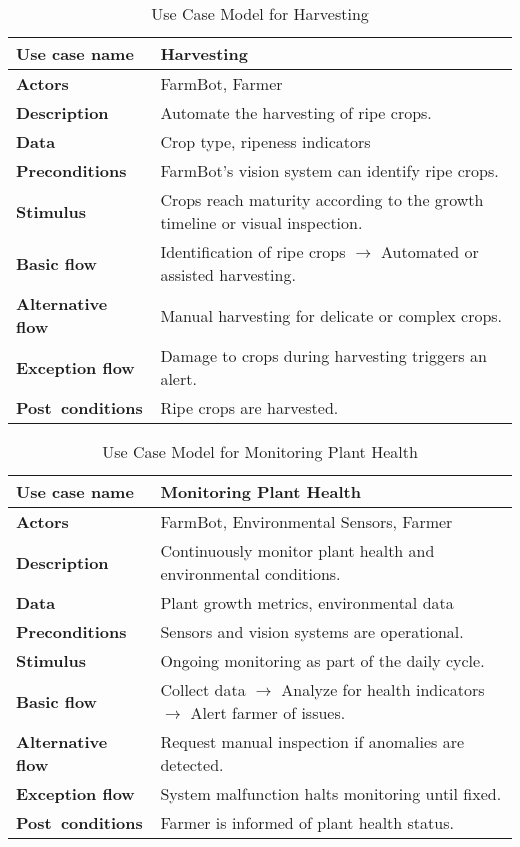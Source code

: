 \begin{table}[H]
\centering
\begin{tabular}{|p{4cm}|p{9cm}|}
\hline
\textbf{Use case name}    & Harvesting \\
\hline
\textbf{Actors}           & FarmBot, Farmer \\
\hline
\textbf{Description}      & Automate the harvesting of ripe crops. \\
\hline
\textbf{Data}             & Crop type, ripeness indicators \\
\hline
\textbf{Preconditions}    & FarmBot's vision system can identify ripe crops. \\
\hline
\textbf{Stimulus}         & Crops reach maturity according to the growth timeline or visual inspection. \\
\hline
\textbf{Basic flow}       & Identification of ripe crops $\rightarrow$ Automated or assisted harvesting. \\
\hline
\textbf{Alternative flow} & Manual harvesting for delicate or complex crops. \\
\hline
\textbf{Exception flow}   & Damage to crops during harvesting triggers an alert. \\
\hline
\textbf{Post conditions}  & Ripe crops are harvested. \\
\hline
\end{tabular}
\caption{Use Case Model for Harvesting}
\end{table}

\begin{table}[H]
\centering
\begin{tabular}{|p{4cm}|p{9cm}|}
\hline
\textbf{Use case name}    & Monitoring Plant Health \\
\hline
\textbf{Actors}           & FarmBot, Environmental Sensors, Farmer \\
\hline
\textbf{Description}      & Continuously monitor plant health and environmental conditions. \\
\hline
\textbf{Data}             & Plant growth metrics, environmental data \\
\hline
\textbf{Preconditions}    & Sensors and vision systems are operational. \\
\hline
\textbf{Stimulus}         & Ongoing monitoring as part of the daily cycle. \\
\hline
\textbf{Basic flow}       & Collect data $\rightarrow$ Analyze for health indicators $\rightarrow$ Alert farmer of issues. \\
\hline
\textbf{Alternative flow} & Request manual inspection if anomalies are detected. \\
\hline
\textbf{Exception flow}   & System malfunction halts monitoring until fixed. \\
\hline
\textbf{Post conditions}  & Farmer is informed of plant health status. \\
\hline
\end{tabular}
\caption{Use Case Model for Monitoring Plant Health}
\end{table}

